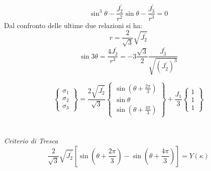 \begin{equation}
	\sin^3 \theta - \frac{J_2^{'}}{r^2} \sin \theta - \frac{J_3^{'}}{r^3} = 0
\end{equation}
Dal confronto delle ultime due relazioni si ha:
\begin{equation}
	r = \frac{2}{\sqrt{3}}\sqrt{J_2^{'}}
\end{equation}
\begin{equation}
	\sin 3 \theta = \frac{4 J_3^{'}}{r^3} = - 3 \frac{\sqrt{3}}{2} \frac{J_3^{'}}{\sqrt{(J_2^{'})^3}}
\end{equation}

\[
\begin{Bmatrix}
	\sigma_1 \\
	\sigma_2 \\
	\sigma_3
\end{Bmatrix}
=
\frac{2\sqrt{J_2^{'}}}{\sqrt{3}}
\begin{Bmatrix}
	\sin(\theta + \frac{2 \pi}{3})	\\
	\sin \theta 					\\
	\sin(\theta + \frac{4 \pi}{3})
\end{Bmatrix}
+
\frac{J_1}{3}
\begin{Bmatrix}
	1	\\
	1	\\
	1
\end{Bmatrix}
\] \\
\\
\emph{Criterio di Tresca} 
\begin{equation}
	\frac{2}{\sqrt{3}}\sqrt{J_2^{'}} [\sin (\theta + \frac{2 \pi}{3})- \sin(\theta + \frac{4 \pi}{3})]  = Y(\kappa)
\end{equation}


